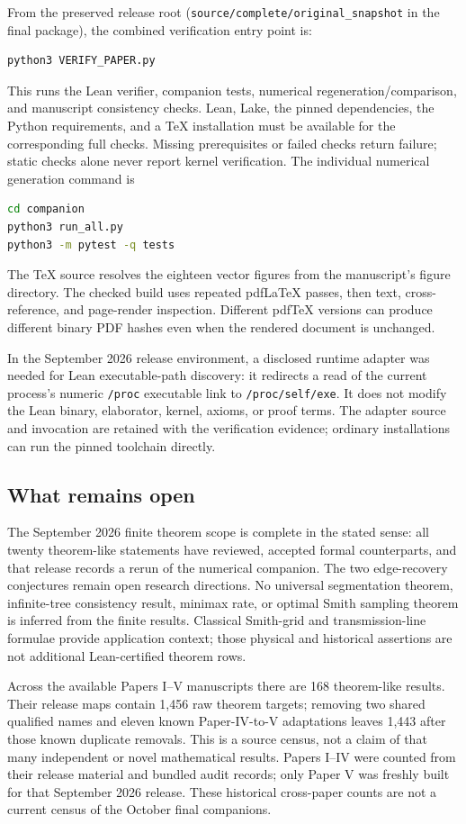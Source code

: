 \documentclass[11pt]{article}
\theoremstyle{definition}
\theoremstyle{remark}
\begin{document}
From the preserved release root (\texttt{source/complete/original\_snapshot} in the final package), the combined verification entry point is:
\begin{lstlisting}[language=bash,numbers=none]
python3 VERIFY_PAPER.py
\end{lstlisting}
This runs the Lean verifier, companion tests, numerical regeneration/comparison, and manuscript consistency checks. Lean, Lake, the pinned dependencies, the Python requirements, and a TeX installation must be available for the corresponding full checks. Missing prerequisites or failed checks return failure; static checks alone never report kernel verification. The individual numerical generation command is
\begin{lstlisting}[language=bash,numbers=none]
cd companion
python3 run_all.py
python3 -m pytest -q tests
\end{lstlisting}
The TeX source resolves the eighteen vector figures from the manuscript's figure directory. The checked build uses repeated pdfLaTeX passes, then text, cross-reference, and page-render inspection. Different pdfTeX versions can produce different binary PDF hashes even when the rendered document is unchanged.

In the September 2026 release environment, a disclosed runtime adapter was needed for Lean executable-path discovery: it redirects a read of the current process's numeric \texttt{/proc} executable link to \texttt{/proc/self/exe}. It does not modify the Lean binary, elaborator, kernel, axioms, or proof terms. The adapter source and invocation are retained with the verification evidence; ordinary installations can run the pinned toolchain directly.

\subsection{What remains open}

The September 2026 finite theorem scope is complete in the stated sense: all twenty theorem-like statements have reviewed, accepted formal counterparts, and that release records a rerun of the numerical companion. The two edge-recovery conjectures remain open research directions. No universal segmentation theorem, infinite-tree consistency result, minimax rate, or optimal Smith sampling theorem is inferred from the finite results. Classical Smith-grid and transmission-line formulae provide application context; those physical and historical assertions are not additional Lean-certified theorem rows.

Across the available Papers I--V manuscripts there are 168 theorem-like results. Their release maps contain 1,456 raw theorem targets; removing two shared qualified names and eleven known Paper-IV-to-V adaptations leaves 1,443 after those known duplicate removals. This is a source census, not a claim of that many independent or novel mathematical results. Papers I--IV were counted from their release material and bundled audit records; only Paper V was freshly built for that September 2026 release. These historical cross-paper counts are not a current census of the October final companions.
\end{document}
